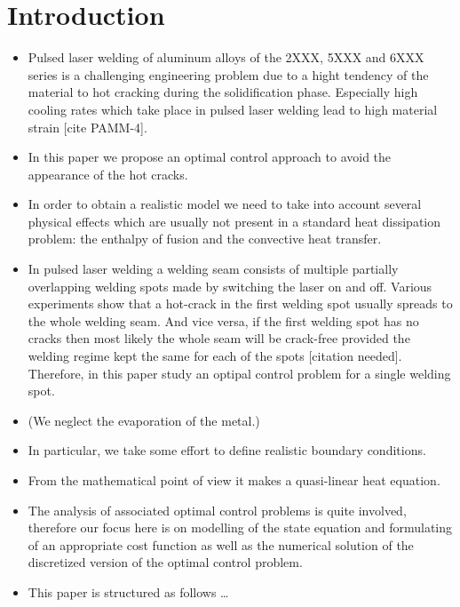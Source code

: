 
\section{Introduction}
\label{sec:introduction}

\begin{itemize}
	\item Pulsed laser welding of aluminum alloys of the 2XXX, 5XXX and 6XXX series is a challenging engineering problem due to a hight tendency of the material to hot cracking during the solidification phase. Especially high cooling rates which take place in pulsed laser welding lead to high material strain [cite PAMM-4].
	\item In this paper we propose an optimal control approach to avoid the appearance of the hot cracks.
	\item In order to obtain a realistic model we need to take into account several physical effects which are usually not present in a standard heat dissipation problem: the enthalpy of fusion and the convective heat transfer.
	\item In pulsed laser welding a welding seam consists of multiple partially overlapping welding spots made by switching the laser on and off. Various experiments show that a hot-crack in the first welding spot usually spreads to the whole welding seam. And vice versa, if the first welding spot has no cracks then most likely the whole seam will be crack-free provided the welding regime kept the same for each of the spots [citation needed]. Therefore, in this paper study an optipal control problem for a single welding spot.
	\item (We neglect the evaporation of the metal.)
	\item In particular, we take some effort to define realistic boundary conditions.
	\item From the mathematical point of view it makes a quasi-linear heat equation.
	\item The analysis of associated optimal control problems is quite involved, therefore our focus here is on modelling of the state equation and formulating of an appropriate cost function as well as the numerical solution of the discretized version of the optimal control problem.
	\item This paper is structured as follows \ldots
\end{itemize}


